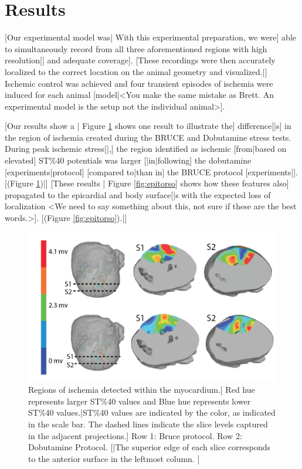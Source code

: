 \documentclass[twocolumn]{cinc}
\begin{document}
\section{Results}

[Our experimental model was| With this experimental preparation, we were]
able to simultaneously record from all three aforementioned regions with
high resolution[| and adequate coverage]. [These recordings were then
accurately localized to the correct location on the animal geometry and
visualized.|] Ischemic control was achieved and four transient episodes of
ischemia were induced for each animal [model|<You make the same mistake as
Brett.  An experimental model is the setup not the individual animal>].

[Our results show a | Figure \ref{fig:myo} shows one result to illustrate
the] difference[|s] in the region of ischemia created during the BRUCE and
Dobutamine stress tests. During peak ischemic stress[|,] the region
identified as ischemic [from|based on elevated] ST\%40 potentials was
larger [|in|following] the dobutamine [experiments|protocol] [compared
to|than in] the BRUCE protocol [experiments|]. [(Figure \ref{fig:myo})|]
[These results | Figure \ref{fig:epitorso} shows how these features also]
propagated to the epicardial and body surface[|s with the expected loss of
localization <We need to say something about this, not sure if these are
the best words.>]. [(Figure \ref{fig:epitorso}).|]


\begin{figure}
	\centering
	\includegraphics[width = .45\textwidth]{../Figures/1.png}
	
	\caption{Regions of ischemia detected within the myocardium.[ Red
          hue represents larger ST\%40 values and Blue hue represents lower
          ST\%40 values.|ST\%40 values are indicated by the color, as
          indicated in the scale bar.  The dashed lines indicate the slice
          levels captured in the adjacent projections.] Row 1: Bruce
          protocol. Row 2: Dobutamine Protocol. [|The superior edge of each
          slice corresponds to the anterior surface in the leftmost
          column. ]}
	\label{fig:myo}
\end{figure}
\end{document}
